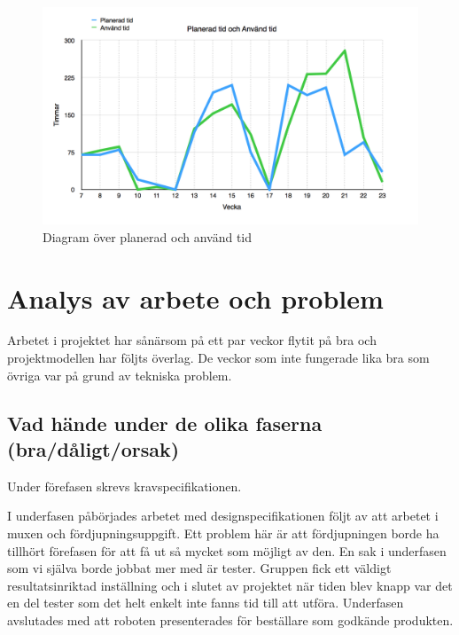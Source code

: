 \documentclass[a4paper,12pt,fleqn]{article}
\begin{document}
\begin{figure}[htp] %
  \begin{center}
  \includegraphics[keepaspectratio=true,scale=0.25]{tid.png}  %
  \end{center}
  \caption{Diagram över planerad och använd tid} %
  \label{fig:tid}
\end{figure}

\newpage

\section{Analys av arbete och problem}
Arbetet i projektet har sånärsom på ett par veckor flytit på bra och projektmodellen har följts överlag. De veckor som inte fungerade lika bra som övriga var på grund av tekniska problem.

\subsection{Vad hände under de olika faserna (bra/dåligt/orsak)}
Under förefasen skrevs kravspecifikationen.

I underfasen påbörjades arbetet med designspecifikationen följt av att arbetet i muxen och fördjupningsuppgift. Ett problem här är att fördjupningen borde ha tillhört förefasen för att få ut så mycket som möjligt av den. En sak i underfasen som vi själva borde jobbat mer med är tester. Gruppen fick ett väldigt resultatsinriktad inställning och i slutet av projektet när tiden blev knapp var det en del tester som det helt enkelt inte fanns tid till att utföra. Underfasen avslutades med att roboten presenterades för beställare som godkände produkten.
\end{document}
